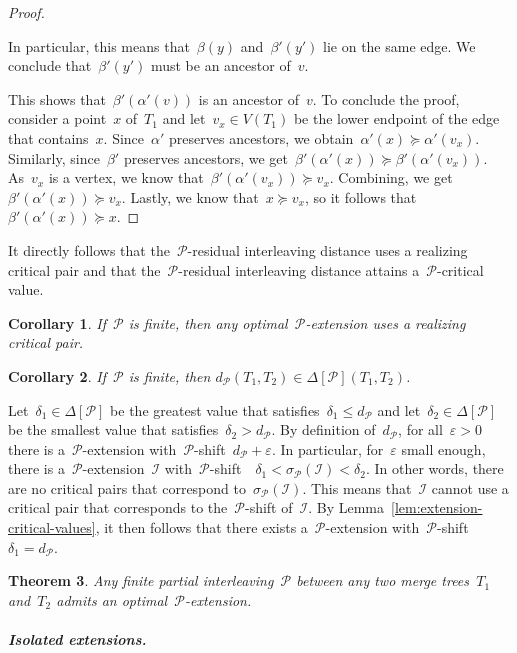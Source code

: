 \documentclass[11pt]{article}
\newtheorem{theorem}{Theorem}
\newtheorem{corollary}[theorem]{Corollary}
\newcommand{\shift}[1]{\sigma_{#1}}
\newcommand{\resdist}[1]{d_{#1}}
\newcommand{\eps}{\varepsilon}
\newcommand{\I}{\mathcal{I}}
\renewcommand{\P}{\mathcal{P}}
\begin{document}
\begin{proof}
\begin{itemize}
            In particular, this means that~$\beta(y)$ and~$\beta'(y')$ lie on the same edge.
            We conclude that~$\beta'(y')$ must be an ancestor of~$v$.
	\end{itemize}
%
    \noindent
    This shows that~$\beta'(\alpha'(v))$ is an ancestor of~$v$.
    To conclude the proof, consider a point~$x$ of~$T_1$ and let~$v_x \in V(T_1)$ be the lower endpoint of the edge that contains~$x$.
	Since~$\alpha'$ preserves ancestors, we obtain~$\alpha'(x) \succeq \alpha'(v_x)$.
	Similarly, since~$\beta'$ preserves ancestors, we get~$\beta'(\alpha'(x)) \succeq \beta'(\alpha'(v_x))$.
	As~$v_x$ is a vertex, we know that~$\beta'(\alpha'(v_x)) \succeq v_x$.
	Combining, we get~$\beta'(\alpha'(x)) \succeq v_x$.
	Lastly, we know that~$x \succeq v_x$, so it follows that~$\beta'(\alpha'(x)) \succeq x$.
\end{proof}
%
\noindent
It directly follows that the~$\P$-residual interleaving distance uses a realizing critical pair and that the~$\P$-residual interleaving distance attains a~$\P$-critical value.
%
\begin{corollary}\label{cor:using-critical-pair}
    If~$\P$ is finite, then any optimal~$\P$-extension uses a realizing critical pair.
\end{corollary}
%
\begin{corollary}\label{cor:critical-values}
	If~$\P$ is finite, then $\resdist{\P}(T_1, T_2) \in \Delta[\P](T_1, T_2)$.
\end{corollary}
%
\noindent
Let~$\delta_1 \in \Delta[\P]$ be the greatest value that satisfies~$\delta_1 \le \resdist{\P}$ and let~$ \delta_2 \in \Delta[\P]$ be the smallest value that satisfies~$\delta_2 > \resdist{\P}$.
By definition of~$\resdist{\P}$, for all~$\eps > 0$ there is a~$\P$-extension with~$\P$-shift~$\resdist{\P} + \eps$.
In particular, for~$\eps$ small enough, there is a~$\P$-extension~$\I$ with~$\P$-shift~~$\delta_1 < \shift{\P}(\I) < \delta_2$.
In other words, there are no critical pairs that correspond to~$\shift{\P}(\I)$. 
This means that~$\I$ cannot use a critical pair that corresponds to the~$\P$-shift of~$\I$.
By Lemma~\ref{lem:extension-critical-values}, it then follows that there exists a~$\P$-extension with~$\P$-shift~$\delta_1 = \resdist{\P}$.
%
\begin{theorem}\label{thm:existence-optimal-extension}
	Any finite partial interleaving~$\P$ between any two merge trees~$T_1$ and~$T_2$ admits an optimal~$\P$-extension.
\end{theorem}
%
\subparagraph{Isolated extensions.}
\end{document}
